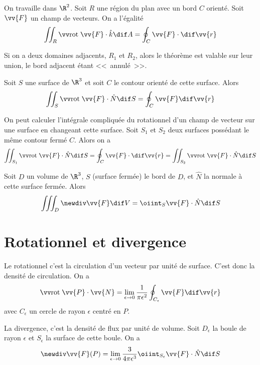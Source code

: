 \begin{mytheo}
	On travaille dans $\R^2$. Soit $R$ une région du plan avec un bord $C$ orienté. Soit $\vv{F}$ un champ de vecteurs. On a l'égalité
	\[ \iint_R \rot \vv{F} \cdot \hat{k} \dif A = \oint_C \vv{F} \cdot \dif \vv{r} \]
\end{mytheo}

\begin{myrem}
	Si on a deux domaines adjacents, $R_1$ et $R_2$, alors le théorème est valable sur leur union, le bord adjacent étant <<~annulé~>>.
\end{myrem}

\begin{mytheo}
	Soit $S$ une surface de $\R^3$ et soit $C$ le contour orienté de cette surface. Alors
	\[ \iint_S \rot \vv{F} \cdot \hat{N} \dif S = \oint_C \vv{F} \dif \vv{r} \]
\end{mytheo}

\begin{myprop}
	On peut calculer l'intégrale compliquée du rotationnel d'un champ de vecteur sur une surface en changeant cette surface. Soit $S_1$ et $S_2$ deux surfaces possédant le même contour fermé $C$. Alors on a
	\[ \iint_{S_1} \rot \vv{F} \cdot \hat{N} \dif S = \oint_C \vv{F} \cdot \dif \vv{r} = \iint_{S_2} \rot \vv{F} \cdot \hat{N} \dif S \]
\end{myprop}

\begin{mytheo}
	Soit $D$ un volume de $\R^3$, $S$ (surface fermée) le bord de $D$, et $\hat{N}$ la normale à cette surface fermée. Alors
	\[ \iiint_D \newdiv \vv{F} \dif V = \oiint_S \vv{F} \cdot \hat{N} \dif S \]
\end{mytheo}

\section{Rotationnel et divergence}

\begin{myprop}[Rotationnel]
	Le rotationnel c'est la circulation d'un vecteur par unité de surface. C'est donc la densité de circulation. On a
	\[ \rot \vv{P} \cdot \vv{N} = \lim_{\epsilon \to 0} \frac 1{\pi \epsilon^2} \oint_{C_\epsilon} \vv{F} \dif \vv{r} \]
	avec $C_\epsilon$ un cercle de rayon $\epsilon$ centré en $P$.
\end{myprop}

\begin{myprop}[Divergence]
	La divergence, c'est la densité de flux par unité de volume. Soit $D_{\epsilon}$ la boule de rayon $\epsilon$ et $S_{\epsilon}$ la surface de cette boule. On a
	\[ \newdiv \vv{F}(P) = \lim_{\epsilon \to 0} \frac{3}{4 \pi \epsilon^3} \oiint_{S_{\epsilon}} \vv{F} \cdot \hat{N} \dif S \]
\end{myprop}


